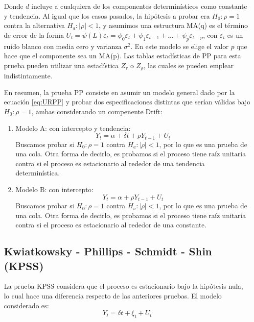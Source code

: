 \documentclass[
]{book}
\begin{document}
Donde \(d\) incluye a cualquiera de los componentes determinísticos como constante y tendencia. Al igual que los casos pasados, la hipótesis a probar era \(H_0 : \rho = 1\) contra la alternativa \(H_a : | \rho | < 1\), y asumimos una estructura MA(q) es el término de error de la forma \(U_t = \psi(L) \varepsilon_t = \psi_0 \varepsilon_t + \psi_1 \varepsilon_{t-1} + \ldots + \psi_p \varepsilon_{t-p}\), con \(\varepsilon_t\) es un ruido blanco con media cero y varianza \(\sigma^2\). En este modelo se elige el valor \(p\) que hace que el componente sea un MA(p). Las tablas estadísticas de PP para esta prueba pueden utilizar una estadística \(Z_\tau\) o \(Z_\rho\), las cuales se pueden emplear indistintamente.

En resumen, la prueba PP consiste en asumir un modelo general dado por la ecuación \eqref{eq:URPP} y probar dos especificaciones distintas que serían válidas bajo \(H_0 : \rho = 1\), ambas considerando un compenente Drift:

\begin{enumerate}
\def\labelenumi{\arabic{enumi}.}
\item
  Modelo A: con intercepto y tendencia:
  \begin{equation*}
   Y_t = \alpha + \delta t + \rho Y_{t-1} + U_t
    \end{equation*}
  Buscamos probar si \(H_0 : \rho = 1\) contra \(H_a : | \rho | < 1\), por lo que es una prueba de una cola. Otra forma de decirlo, es probamos si el proceso tiene raíz unitaria contra si el proceso es estacionario al rededor de una tendencia determinística.
\item
  Modelo B: con intercepto:
  \begin{equation*}
   Y_t = \alpha + \rho Y_{t-1} + U_t
    \end{equation*}
  Buscamos probar si \(H_0 : \rho = 1\) contra \(H_a : | \rho | < 1\), por lo que es una prueba de una cola. Otra forma de decirlo, es probamos si el proceso tiene raíz unitaria contra si el proceso es estacionario al rededor de una constante.
\end{enumerate}

\hypertarget{kwiatkowsky---phillips---schmidt---shin-kpss}{%
\subsection{Kwiatkowsky - Phillips - Schmidt - Shin (KPSS)}\label{kwiatkowsky---phillips---schmidt---shin-kpss}}

La prueba KPSS considera que el proceso es estacionario bajo la hipótesis nula, lo cual hace una diferencia respecto de las anteriores pruebas. El modelo considerado es:
\begin{equation}
    Y_t = \delta t + \xi_t + U_t
\end{equation}
\end{document}

